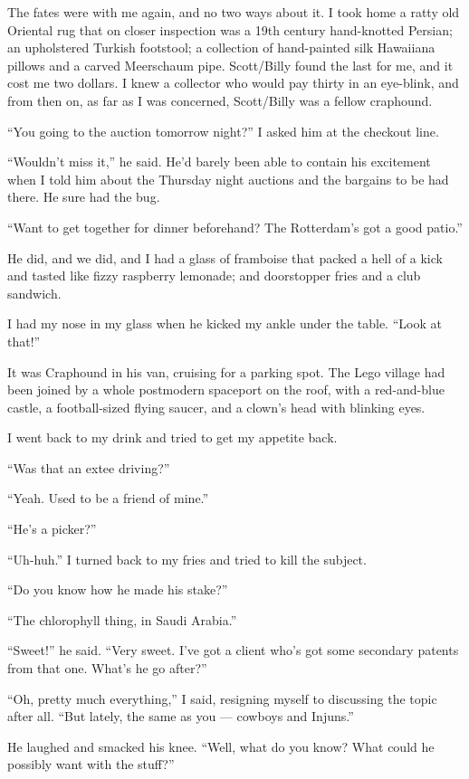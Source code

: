 The fates were with me again, and no two ways about it. I took home
a ratty old Oriental rug that on closer inspection was a 19th
century hand-knotted Persian; an upholstered Turkish footstool; a
collection of hand-painted silk Hawaiiana pillows and a carved
Meerschaum pipe. Scott/Billy found the last for me, and it cost me
two dollars. I knew a collector who would pay thirty in an
eye-blink, and from then on, as far as I was concerned, Scott/Billy
was a fellow craphound.

``You going to the auction tomorrow night?'' I asked him at the
checkout line.

``Wouldn't miss it,'' he said. He'd barely been able to contain his
excitement when I told him about the Thursday night auctions and
the bargains to be had there. He sure had the bug.

``Want to get together for dinner beforehand? 
The Rotterdam's got a good patio.''

He did, and we did, and I had a glass of framboise that packed a
hell of a kick and tasted like fizzy raspberry lemonade; and
doorstopper fries and a club sandwich.

I had my nose in my glass when he kicked my ankle under the table.
``Look at that!''

It was Craphound in his van, cruising for a parking spot. The Lego
village had been joined by a whole postmodern spaceport on the
roof, with a red-and-blue castle, a football-sized flying saucer,
and a clown's head with blinking eyes.

I went back to my drink and tried to get my appetite back.

``Was that an extee driving?''

``Yeah. Used to be a friend of mine.''

``He's a picker?''

``Uh-huh.'' I turned back to my fries and tried to kill the
subject.

``Do you know how he made his stake?''

``The chlorophyll thing, in Saudi Arabia.''

``Sweet!'' he said.
``Very sweet. I've got a client who's got some secondary patents 
from that one. What's he go after?''

``Oh, pretty much everything,'' I said, resigning myself to
discussing the topic after all.
``But lately, the same as you --- cowboys and Injuns.''

He laughed and smacked his knee.
``Well, what do you know? What could he possibly want with the stuff?''

